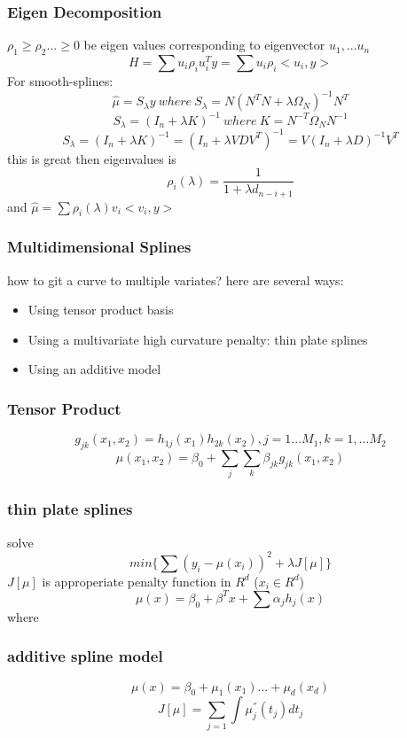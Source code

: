 \documentclass[10pt]{article}
\theoremstyle{break}
\begin{document}
        \subsubsection{Eigen Decomposition}
        $\rho_1\geq \rho_2...\geq 0$ be eigen values corresponding to eigenvector $u_1, ...u_n$
            $$H=\sum u_i \rho_i u_i^T y = \sum u_i \rho_i <u_i, y>$$
            For smooth-splines: 
            $$\hat{\mu}=S_\lambda y\ where\ S_\lambda = N(N^TN+\lambda \Omega_N)^{-1}N^T$$
            $$S_\lambda = (I_n+\lambda K )^{-1}\ where\ K=N^{-T}\Omega_NN^{-1}$$
            $$S_\lambda=(I_n+\lambda K)^{-1}=(I_n+\lambda VDV^T)^{-1}=V(I_n+\lambda D)^{-1}V^T$$
            this is great then eigenvalues is $$\rho_i(\lambda)=\frac{1}{1+\lambda d_{n-i+1}}$$
            and $\hat{\mu}= \sum \rho_i(\lambda)v_i<v_i, y>$
        \subsubsection{Multidimensional Splines}
        how to git a curve to multiple variates? here are several ways:
            \begin{itemize}
                \item Using tensor product basis 
                \item Using a multivariate high curvature penalty: thin plate splines 
                \item Using an additive model
            \end{itemize}
        \subsubsection{Tensor Product}
            $$g_{jk}(x_1,x_2)=h_{1j}(x_1)h_{2k}(x_2), j=1...M_1, k=1,...M_2$$
            $$\mu(x_1,x_2)=\beta_0+\sum_j\sum_k\beta_{jk}g_{jk}(x_1,x_2)$$
        \subsubsection{thin plate splines}
            solve $$min\{\sum(y_i-\mu(x_i))^2+\lambda J[\mu]\}$$
            $J[\mu]$ is approperiate penalty function in $R^d$ ($x_i \in R^d$) 
            $$\mu(x)=\beta_0+\beta^Tx+\sum\alpha_jh_j(x)$$
            where 
        \subsubsection{additive spline model}
            $$\mu(x)=\beta_0+\mu_1(x_1)...+\mu_d(x_d)$$
            $$J[\mu]=\sum_{j=1} \int \mu_j^{''}(t_j)dt_j$$
            
\end{document}
